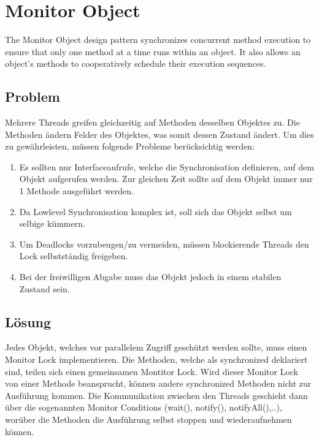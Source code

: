 \section{Monitor Object}


The Monitor Object design pattern synchronizes concurrent method
execution to ensure that only one method at a time runs within an
object. It also allows an object’s methods to cooperatively schedule
their execution sequences.

\subsection{Problem}


Mehrere Threads greifen gleichzeitig auf Methoden desselben Objektes zu. Die Methoden ändern Felder des Objektes, was somit dessen Zustand ändert. Um dies zu gewährleisten, müssen folgende Probleme berücksichtig werden:


\begin{enumerate}
	\item Es sollten nur Interfaceaufrufe, welche die Synchronisation definieren, auf dem Objekt aufgerufen werden. Zur gleichen Zeit sollte auf dem Objekt immer nur 1 Methode ausgeführt werden.
	\item Da Lowlevel Synchronisation komplex ist, soll sich das Objekt selbst um selbige kümmern.
	\item Um Deadlocks vorzubeugen/zu vermeiden, müssen blockierende Threads den Lock selbstständig freigeben.
	\item Bei der freiwilligen Abgabe muss das Objekt jedoch in einem stabilen Zustand sein.
\end{enumerate}

\subsection{Lösung}


Jedes Objekt, welches vor parallelem Zugriff geschützt werden sollte, muss einen Monitor Lock implementieren. Die Methoden, welche als synchronized deklariert sind, teilen sich einen gemeinsamen Montitor Lock. Wird dieser Monitor Lock von einer Methode beansprucht, können andere synchronized Methoden nicht zur Ausführung kommen. Die Kommunikation zwischen den Threads geschieht dann über die sogenannten Monitor Conditions (wait(), notify(), notifyAll(),..), worüber die Methoden die Ausführung selbst stoppen und wiederaufnehmen können.


